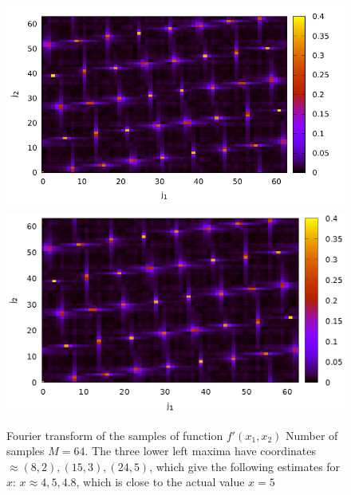 \begin{figure}
\centering

\ifpdf
\includegraphics[angle=0]
{./part4/quantcomp/picellipticdiscretlog2.pdf}
\else
\includegraphics[angle=0]
{./part4/quantcomp/picellipticdiscretlog2.eps}
\fi

%

\caption{Fourier transform of the samples of function 
$f'(x_1, x_2)$
Number of samples $M=64$. The three lower left maxima have coordinates $\approx (8,2), (15,3), (24,5)$, which give the following estimates for $x$: $x \approx 4, 5, 4.8$,
which is close to the actual value $x = 5$
} 
\label{fig:part4:quantcomp:dle2}
\end{figure}